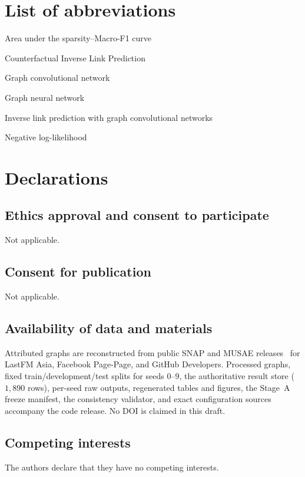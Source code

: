 \documentclass[11pt,a4paper]{article}
\begin{document}
\section*{List of abbreviations}
\begin{description}[style=nextline,leftmargin=3.2cm,font=\normalfont]
\item[AUC] Area under the sparsity--Macro-F1 curve
\item[CILP] Counterfactual Inverse Link Prediction
\item[GCN] Graph convolutional network
\item[GNN] Graph neural network
\item[ILP-GCN] Inverse link prediction with graph convolutional networks
\item[NLL] Negative log-likelihood
\end{description}

\section*{Declarations}

\subsection*{Ethics approval and consent to participate}
Not applicable.

\subsection*{Consent for publication}
Not applicable.

\subsection*{Availability of data and materials}
Attributed graphs are reconstructed from public SNAP and MUSAE releases~\citep{rozemberczki2021multi} for LastFM Asia, Facebook Page-Page, and GitHub Developers.
Processed graphs, fixed train/development/test splits for seeds $0$--$9$, the authoritative result store ($1{,}890$ rows), per-seed raw outputs, regenerated tables and figures, the Stage~A freeze manifest, the consistency validator, and exact configuration sources accompany the code release.
No DOI is claimed in this draft.

\subsection*{Competing interests}
The authors declare that they have no competing interests.
\end{document}

